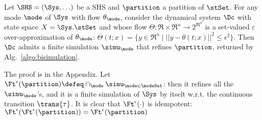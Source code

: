 \begin{lemma}
	\label{lemma:finite simu}
	Let $\SHS = (\Sys,\ldots)$ be a SHS and $\partition$ a partition of $\stSet$.
	For any mode $\mode$ of $\Sys$ with flow $\theta_\mode $, consider the dynamical system $\Dc$ with state space $X = \Sys.\stSet$ and whose flow $\Theta: \Re \times \Re^n \rightarrow 2^{\Re^n}$ is a set-valued $\varepsilon$ over-approximation of $\theta_\mode$:
	$\Theta(t;x) = \{y \in \Re^n \;|\; ||y-\theta(t;x)||^2 \leq \epsilon^2\}$.	
	Then $\Dc$ admits a finite simulation $\simu_\mode$ that refines $\partition$, returned by Alg.~\ref{algo:bisimulation}.
\end{lemma}
The proof is in the Appendix.
Let $\Ft^\epsilon(\partition) \defeq \cap_{\mode}\simu_{\mode \in \modeSet}$: then it refines all the $\simu_\mode$'s, and it is a finite simulation of $\Sys$ by itselt w.r.t. the continuous transition $\trans{\tau}$.
It is clear that $\Ft^\epsilon(\cdot)$ is idempotent: $\Ft^\epsilon(\Ft^\epsilon(\partition)) = \Ft^\epsilon(\partition)$
